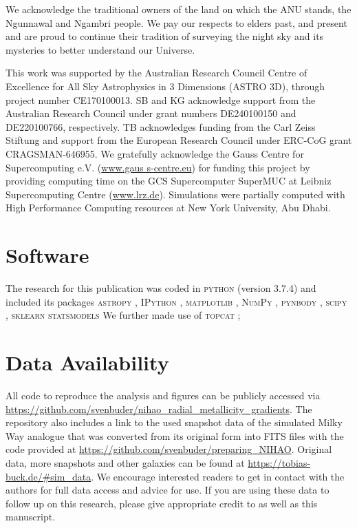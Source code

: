 \documentclass[twocolumn,apj,numberedappendix,appendixfloats]{openjournal}
\begin{document}
\begin{CJK*}{UTF8}{gbsn}
We acknowledge the traditional owners of the land on which the ANU stands, the Ngunnawal and Ngambri people. We pay our respects to elders past, and present and are proud to continue their tradition of surveying the night sky and its mysteries to better understand our Universe.

This work was supported by the Australian Research Council Centre of Excellence for All Sky Astrophysics in 3 Dimensions (ASTRO 3D), through project number CE170100013. SB and KG acknowledge support from the Australian Research Council under grant numbers DE240100150 and DE220100766, respectively. TB acknowledges funding from the Carl Zeiss Stiftung and support from the European Research Council under ERC-CoG grant CRAGSMAN-646955. We gratefully acknowledge the Gauss Centre for Supercomputing e.V. (\url{www.gaus s-centre.eu}) for funding this project by providing computing time on the GCS Supercomputer SuperMUC at Leibniz Supercomputing Centre (\url{www.lrz.de}). Simulations were partially computed with High Performance Computing resources at New York University, Abu Dhabi.

\section*{Software}

The research for this publication was coded in \textsc{python} (version 3.7.4) and included its packages
\textsc{astropy} \citep[v. 3.2.2;][]{Robitaille2013,PriceWhelan2018},
\textsc{IPython} \citep[v. 7.8.0;][]{ipython},
\textsc{matplotlib} \citep[v. 3.1.3;][]{matplotlib},
\textsc{NumPy} \citep[v. 1.17.2;][]{numpy},
\textsc{pynbody} \citep[v. 1.1.0;][]{pynbody},
\textsc{scipy} \citep[v. 1.3.1;][]{Scipy},
\textsc{sklearn} \citep[v. 1.5.1][]{scikit-learn}
\textsc{statsmodels} \citep[v. 0.14.2][]{statsmodels}
We further made use of \textsc{topcat} \citep[version 4.7;][]{Taylor2005};

\section*{Data Availability}

All code to reproduce the analysis and figures can be publicly accessed via \url{https://github.com/svenbuder/nihao_radial_metallicity_gradients}. The repository also includes a link to the used snapshot data of the simulated Milky Way analogue that was converted from its original form into FITS files with the code provided at \url{https://github.com/svenbuder/preparing_NIHAO}. Original data, more snapshots and other galaxies can be found at \url{https://tobias-buck.de/#sim_data}. We encourage interested readers to get in contact with the authors for full data access and advice for use. If you are using these data to follow up on this research, please give appropriate credit to \citet{Buck2020b, Buck2021} as well as this manuscript.

\end{CJK*}
\end{document}
